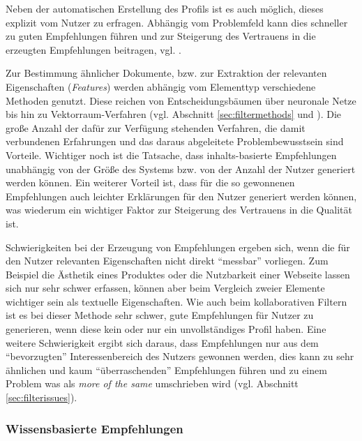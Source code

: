 Neben der automatischen Erstellung des Profils ist es auch möglich, dieses explizit vom Nutzer zu erfragen. Abhängig vom Problemfeld kann dies schneller zu guten Empfehlungen führen und zur Steigerung des Vertrauens in die erzeugten Empfehlungen beitragen, vgl. \citep{hb_20}.

Zur Bestimmung ähnlicher Dokumente, bzw. zur Extraktion der relevanten Eigenschaften (\textit{Features}) werden abhängig vom Elementtyp verschiedene Methoden genutzt. Diese reichen von Entscheidungsbäumen über neuronale Netze bis hin zu Vektorraum-Verfahren (vgl. Abschnitt \ref{sec:filtermethods} und \citep[Kap. 3]{rs}). Die große Anzahl der dafür zur Verfügung stehenden Verfahren, die damit verbundenen Erfahrungen und das daraus abgeleitete Problembewusstsein sind Vorteile. Wichtiger noch ist die Tatsache, dass inhalts-basierte Empfehlungen unabhängig von der Größe des Systems bzw. von der Anzahl der Nutzer generiert werden können. Ein weiterer Vorteil ist, dass für die so gewonnenen Empfehlungen auch leichter Erklärungen für den Nutzer generiert werden können, was wiederum ein wichtiger Faktor zur Steigerung des Vertrauens in die Qualität ist.

Schwierigkeiten bei der Erzeugung von Empfehlungen ergeben sich, wenn die für den Nutzer relevanten Eigenschaften nicht direkt ``messbar'' vorliegen. Zum Beispiel die Ästhetik eines Produktes oder die Nutzbarkeit einer Webseite lassen sich nur sehr schwer erfassen, können aber beim Vergleich zweier Elemente wichtiger sein als textuelle Eigenschaften. Wie auch beim kollaborativen Filtern ist es bei dieser Methode sehr schwer, gute Empfehlungen für Nutzer zu generieren, wenn diese kein oder nur ein unvollständiges Profil haben. Eine weitere Schwierigkeit ergibt sich daraus, dass Empfehlungen nur aus dem ``bevorzugten'' Interessenbereich des Nutzers gewonnen werden, dies kann zu sehr ähnlichen und kaum ``überraschenden'' Empfehlungen führen und zu einem Problem was als \textit{more of the same} umschrieben wird (vgl. Abschnitt \ref{sec:filterissues}).  \citep[Kap. 3]{rs} \citep{hb_03}


\subsubsection{Wissensbasierte Empfehlungen}

